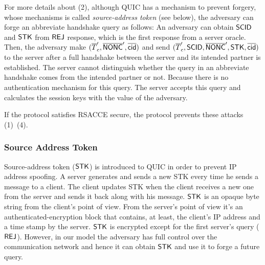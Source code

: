 For more details about (2), although QUIC has a mechanism to prevent forgery,
whose mechanisms is called \textit{source-address token}
(see below), the adversary can forge an abbreviate handshake
query as follows: An adversary can obtain $\mathsf{SCID}$ and $\mathsf{STK}$ from $\mathsf{REJ}$
response, which is the first response from a server oracle.
Then, the adversary make $(\overline{T}_c^{\prime},
\overline{\mathsf{NONC}}^{\prime}, \overline{\mathsf{cid}})$ and send $(\overline{T}_c^{\prime},
\mathsf{SCID}, \overline{\mathsf{NONC}}^{\prime}, \mathsf{STK}, \overline{\mathsf{cid}})$ to the server after a
full handshake between the server and its intended partner
is established.
The server cannot distinguish whether the query in an abbreviate handshake
comes from the intended partner or not. Because there is no
authentication mechanism for this query. The server accepts
this query and calculates the session keys with the value
of the adversary.

If the protocol satisfies RSACCE secure, the protocol prevents these attacks (1)~(4).

\subsubsection{Source Address Token} \label{sec:source_address_token}
Source-address token ($\mathsf{STK}$) is introduced to QUIC in order to
prevent IP address spoofing.
A server generates and sends a new STK every time he sends a
message to a client.
The client updates STK when the client receives a new one from
the server and sends it back along with his message.
$\mathsf{STK}$ is an opaque byte string from the client's point of view.
From the server's point of view it's an authenticated-encryption
block that contains, at least, the client's IP address and a time
stamp by the server.
$\mathsf{STK}$ is encrypted except for the first server's query ($\mathsf{REJ}$).
However, in our model the adversary has full control over the
communication network and hence it can obtain $\mathsf{STK}$ and use it to
forge a future query.
